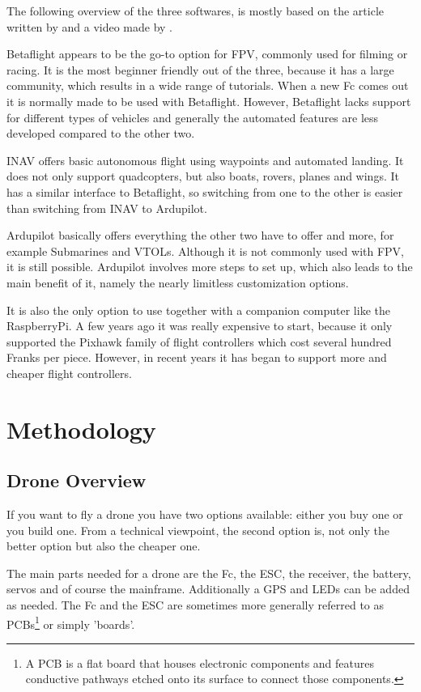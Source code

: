 \documentclass[svgnames]{article}
\begin{document}
	The following overview of the three softwares, is mostly based on the article written by \textcite{firmwarearticle} and a video made by \textcite{firmwarevideo}.
	
	Betaflight appears to be the go-to option for \gls{FPV}, commonly used for filming or racing. It is the most beginner friendly out of the three, because it has a large community, which results in a wide range of tutorials. When a new \gls{Fc} comes out it is normally made to be used with Betaflight. However, Betaflight lacks support for different types of vehicles and generally the automated features are less developed compared to the other two. 
	
	\gls{INAV} offers basic autonomous flight using waypoints and automated landing. It does not only support quadcopters, but also boats, rovers, planes and wings. It has a similar interface to Betaflight, so switching from one to the other is easier than switching from \gls{INAV} to Ardupilot.
	
	Ardupilot basically offers everything the other two have to offer and more, for example Submarines and \glspl{VTOL}. Although it is not commonly used with \gls{FPV}, it is still possible. Ardupilot involves more steps to set up, which also leads to the main benefit of it, namely the nearly limitless customization options.

	
	It is also the only option to use together with a companion computer like the RaspberryPi. A few years ago it was really expensive to start, because it only supported the Pixhawk family of flight controllers which cost several hundred Franks per piece. However, in recent years it has began to support more and cheaper flight controllers.
	
	\section{Methodology}
	\subsection{Drone Overview}
	If you want to fly a drone you have two options available: either you buy one or you build one. From a technical viewpoint, the second option is, not only the better option but also the cheaper one.
	
	The main parts needed for a drone are the \gls{Fc}, the \gls{ESC}, the receiver, the battery, servos and of course the mainframe. Additionally a \gls{GPS} and LEDs can be added as needed. The \gls{Fc} and the \gls{ESC} are sometimes more generally referred to as \glspl{PCB}\footnote{A \gls{PCB} is a flat board that houses electronic components and features conductive pathways etched onto its surface to connect those components.} or simply 'boards'.
\end{document}
